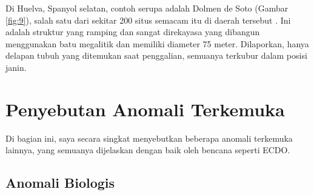 \documentclass[10pt,twocolumn,letterpaper]{article}
\begin{document}
Di Huelva, Spanyol selatan, contoh serupa adalah Dolmen de Soto (Gambar \ref{fig:9}), salah satu dari sekitar 200 situs semacam itu di daerah tersebut \cite{72,32}. Ini adalah struktur yang ramping dan sangat direkayasa yang dibangun menggunakan batu megalitik dan memiliki diameter 75 meter. Dilaporkan, hanya delapan tubuh yang ditemukan saat penggalian, semuanya terkubur dalam posisi janin.

\section{Penyebutan Anomali Terkemuka}

Di bagian ini, saya secara singkat menyebutkan beberapa anomali terkemuka lainnya, yang semuanya dijelaskan dengan baik oleh bencana seperti ECDO.

\subsection{Anomali Biologis}
\end{document}
